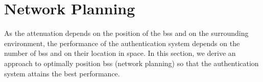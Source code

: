 \documentclass[conference]{IEEEtran}
\begin{document}



\section{Network Planning}\label{sec:bsPos}

As the attenuation depends on the position of the \acp{bs} and on the surrounding environment, the performance of the authentication system depends on the number of \acp{bs} and on their location in space. In this section, we derive an approach to optimally position \acp{bs} (network planning) so that the authentication system attains the best performance. 
\end{document}
